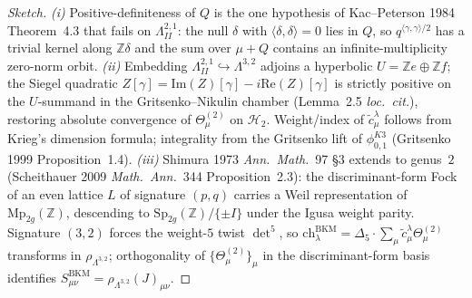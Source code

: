 \begin{proof}[Sketch]
\emph{(i)} Positive-definiteness of $Q$ is the one hypothesis of Kac--Peterson 1984 Theorem~4.3 that fails on $\Lambda^{2,1}_{II}$: the null $\delta$ with $\langle\delta,\delta\rangle=0$ lies in $Q$, so $q^{\langle\gamma,\gamma\rangle/2}$ has a trivial kernel along $\mathbb Z\delta$ and the sum over $\mu+Q$ contains an infinite-multiplicity zero-norm orbit. \emph{(ii)} Embedding $\Lambda^{2,1}_{II}\hookrightarrow\Lambda^{3,2}$ adjoins a hyperbolic $U=\mathbb Z e\oplus\mathbb Z f$; the Siegel quadratic $Z[\gamma]=\mathrm{Im}(Z)[\gamma]-i\mathrm{Re}(Z)[\gamma]$ is strictly positive on the $U$-summand in the Gritsenko--Nikulin chamber (Lemma~2.5 \emph{loc.\ cit.}), restoring absolute convergence of $\Theta^{(2)}_\mu$ on $\mathcal H_2$. Weight/index of $\tilde c^\lambda_\mu$ follows from Krieg's dimension formula; integrality from the Gritsenko lift of $\phi^{K3}_{0,1}$ (Gritsenko 1999 Proposition~1.4). \emph{(iii)} Shimura 1973 \emph{Ann.\ Math.}~97 \S3 extends to genus~$2$ (Scheithauer 2009 \emph{Math.\ Ann.}~344 Proposition~2.3): the discriminant-form Fock of an even lattice $L$ of signature $(p,q)$ carries a Weil representation of $\mathrm{Mp}_{2g}(\mathbb Z)$, descending to $\mathrm{Sp}_{2g}(\mathbb Z)/\{\pm I\}$ under the Igusa weight parity. Signature $(3,2)$ forces the weight-$5$ twist $\det^5$, so $\mathrm{ch}_\lambda^{\mathrm{BKM}}=\Delta_5\cdot\sum_\mu\tilde c^\lambda_\mu\Theta^{(2)}_\mu$ transforms in $\rho_{\Lambda^{3,2}}$; orthogonality of $\{\Theta^{(2)}_\mu\}_\mu$ in the discriminant-form basis identifies $S^{\mathrm{BKM}}_{\mu\nu}=\rho_{\Lambda^{3,2}}(J)_{\mu\nu}$.
\end{proof}

